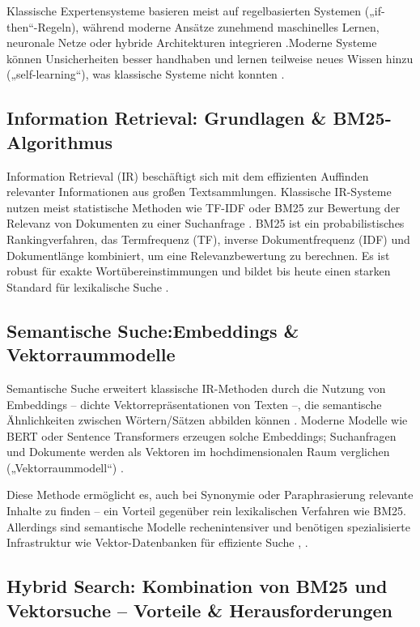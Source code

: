 Klassische Expertensysteme basieren meist auf regelbasierten Systemen („if-then“-Regeln), während moderne Ansätze zunehmend maschinelles Lernen, neuronale Netze oder hybride Architekturen integrieren \cite{HayesRoth1984} \cite{Liao2004}.Moderne Systeme können Unsicherheiten besser handhaben und lernen teilweise neues Wissen hinzu („self-learning“), was klassische Systeme nicht konnten \cite{Salmanova2024} \cite{Nikolopoulos1997}.


\subsection{Information Retrieval: Grundlagen \& BM25-Algorithmus}

Information Retrieval (IR) beschäftigt sich mit dem effizienten Auffinden relevanter Informationen aus großen Textsammlungen. Klassische IR-Systeme nutzen meist statistische Methoden wie TF-IDF oder BM25 zur Bewertung der Relevanz von Dokumenten zu einer Suchanfrage \cite{Farivar2025} \cite{Singh2025}.
BM25 ist ein probabilistisches Rankingverfahren, das Termfrequenz (TF), inverse Dokumentfrequenz (IDF) und Dokumentlänge kombiniert, um eine Relevanzbewertung zu berechnen. Es ist robust für exakte Wortübereinstimmungen und bildet bis heute einen starken Standard für lexikalische Suche \cite{Farivar2025}.


\subsection{Semantische Suche:Embeddings \& Vektorraummodelle}

Semantische Suche erweitert klassische IR-Methoden durch die Nutzung von Embeddings – dichte Vektorrepräsentationen von Texten –, die semantische Ähnlichkeiten zwischen Wörtern/Sätzen abbilden können \cite{Farivar2025} \cite{Kamalloo2023}. Moderne Modelle wie BERT oder Sentence Transformers erzeugen solche Embeddings; Suchanfragen und Dokumente werden als Vektoren im hochdimensionalen Raum verglichen („Vektorraummodell“) \cite{Farivar2025} \cite{Kamalloo2023}.

Diese Methode ermöglicht es, auch bei Synonymie oder Paraphrasierung relevante Inhalte zu finden – ein Vorteil gegenüber rein lexikalischen Verfahren wie BM25. Allerdings sind semantische Modelle rechenintensiver und benötigen spezialisierte Infrastruktur wie Vektor-Datenbanken für effiziente Suche \cite{Kamalloo2023}, \cite{Manoorkar2025}.

\subsection{Hybrid Search: Kombination von BM25 und Vektorsuche – Vorteile \& Herausforderungen}

